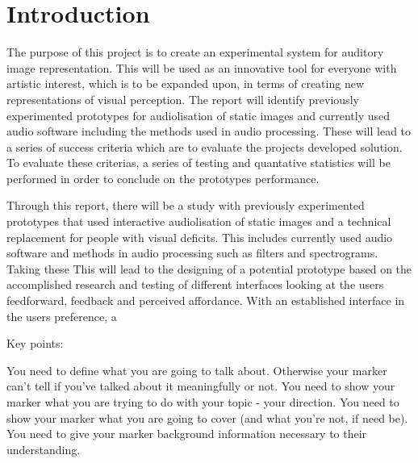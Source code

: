 \chapter{Introduction}\label{ch:introduction}

The purpose of this project is to create an experimental system for auditory image representation. This will be used as an innovative tool for everyone with artistic interest, which is to be expanded upon, in terms of creating new representations of visual perception. The report will identify previously experimented prototypes for audiolisation of static images and currently used audio software including the methods used in audio processing. These will lead to a series of success criteria which are to evaluate the projects developed solution. To evaluate these criterias, a series of testing and quantative statistics will be performed in order to conclude on the prototypes performance.   


Through this report, there will be a study with previously experimented prototypes that used interactive audiolisation of static images and a technical replacement for people with visual deficits. This includes currently used audio software and methods in audio processing such as filters and spectrograms. Taking these This will lead to the designing of a potential prototype based on the accomplished research and testing of different interfaces looking at the users feedforward, feedback and perceived affordance. With an established interface in the users preference, a       

Key points:

You need to define what you are going to talk about. Otherwise your marker can't tell if you've talked about it meaningfully or not.
You need to show your marker what you are trying to do with your topic - your direction.
You need to show your marker what you are going to cover (and what you're not, if need be).
You need to give your marker background information necessary to their understanding.
